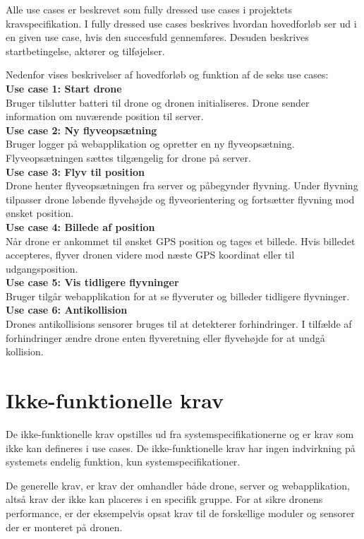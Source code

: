 Alle use cases er beskrevet som fully dressed use cases i projektets kravspecifikation. 
I fully dressed use cases beskrives hvordan hovedforløb ser ud i en given use case, hvis den succesfuld gennemføres. Desuden beskrives startbetingelse, aktører og tilføjelser.

Nedenfor vises beskrivelser af hovedforløb og funktion af de seks use cases:\\

\textbf{Use case 1: Start drone} \\
Bruger tilslutter batteri til drone og dronen initialiseres. Drone sender information om nuværende position til server.\\

\textbf{Use case 2: Ny flyveopsætning} \\
Bruger logger på webapplikation og opretter en ny flyveopsætning. Flyveopsætningen sættes tilgængelig for drone på server.\\

\textbf{Use case 3: Flyv til position}\\
Drone henter flyveopsætningen fra server og påbegynder flyvning. Under flyvning tilpasser drone  løbende flyvehøjde og flyveorientering og fortsætter flyvning mod ønsket position. \\

\textbf{Use case 4: Billede af position} \\
Når drone er ankommet til ønsket GPS position og tages et billede. Hvis billedet accepteres, flyver dronen videre mod næste GPS koordinat eller til udgangsposition. \\

\textbf{Use case 5: Vis tidligere flyvninger} \\
Bruger tilgår webapplikation for at se flyveruter og billeder tidligere flyvninger.\\

\textbf{Use case 6: Antikollision} \\
Drones antikollisions sensorer bruges til at detekterer forhindringer. I tilfælde af forhindringer ændre drone enten flyveretning eller flyvehøjde for at undgå kollision. \\



\section{Ikke-funktionelle krav}

De ikke-funktionelle krav opstilles ud fra systemspecifikationerne og er krav som ikke kan defineres i use cases. De ikke-funktionelle krav har ingen indvirkning på systemets endelig funktion, kun systemspecifikationer.  

De generelle krav, er krav der omhandler både drone, server og webapplikation, altså krav der ikke kan placeres i en specifik gruppe. For at sikre dronens performance, er der eksempelvis opsat krav til de forskellige moduler og sensorer der er monteret på dronen. 

